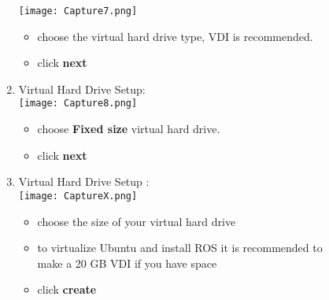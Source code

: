 \documentclass[12pt]{article}
\begin{document}
\begin{description}
\begin{description}
\begin{enumerate}[label=\alph*)]
        \hspace*{-2.5cm}\texttt{[image: Capture7.png]}\\
        \begin{itemize}
                        
                \item choose the virtual hard drive type, VDI is recommended. 
                \item click {\bf next}
                           
        \end{itemize}

\newpage
\item Virtual Hard Drive Setup: \vspace{5mm} \\

      		\hspace*{-2.5cm}\texttt{[image: Capture8.png]}\\
            \begin{itemize}
                
                \item choose {\bf Fixed size} virtual hard drive. 
                \item click {\bf next}
                              
            \end{itemize}

\vspace{10mm}
\item Virtual Hard Drive Setup : \vspace{5mm} \\
      		\hspace*{-2.5cm}\texttt{[image: CaptureX.png]}\\
             \begin{itemize}
                    
                \item choose the size of your virtual hard drive       
                \item to virtualize Ubuntu and install ROS it is recommended to make a 20 GB VDI if you have space
                \item click {\bf create}
          
            
                
            \end{itemize}
	\newpage

     \end{enumerate}


\end{description}
\end{description}
\end{document}
